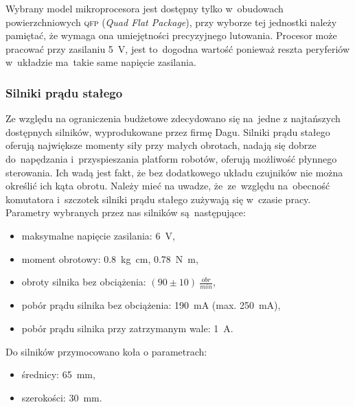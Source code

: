 \documentclass[11pt]{article}
\begin{document}
Wybrany model mikroprocesora jest dostępny tylko w~obudowach powierzchniowych \textsc{qfp} (\textit{Quad Flat Package}), przy wyborze tej jednostki należy pamiętać, że wymaga ona umiejętności precyzyjnego lutowania. Procesor może pracować przy zasilaniu 5~\si{\volt}, jest to~dogodna wartość ponieważ reszta peryferiów w~układzie ma~takie same napięcie zasilania.

\subsubsection{Silniki prądu stałego}
Ze względu na ograniczenia budżetowe zdecydowano się na~jedne z najtańszych dostępnych silników, wyprodukowane przez firmę Dagu.
Silniki prądu stałego oferują największe momenty siły przy małych obrotach, nadają się dobrze do~napędzania i~przyspieszania platform robotów, oferują możliwość płynnego sterowania.
Ich wadą jest fakt, że bez dodatkowego układu czujników nie można określić ich kąta obrotu.
Należy mieć na uwadze, że~ze~względu na~obecność komutatora i~szczotek silniki prądu stałego zużywają się w~czasie pracy.
Parametry wybranych przez nas silników są~następujące:
\begin{itemize}
	\item maksymalne napięcie zasilania: 6~\si{\volt},
	\item moment obrotowy: \SI[inter-unit-product =\ensuremath{\cdot}]{0,8}{\kilogram\centi\meter}, \SI[inter-unit-product =\ensuremath{\cdot}]{0,78}{\newton\meter},
	\item obroty silnika bez obciążenia: $ (90 \pm 10) \ \frac{obr}{min} $,
	\item pobór prądu silnika bez obciążenia: 190~\si{\milli\ampere} (max. 250~\si{\milli\ampere}),
	\item pobór prądu silnika przy zatrzymanym wale: 1~\si{\ampere}.
\end{itemize}
Do silników przymocowano koła o parametrach:
\begin{itemize}
	\item średnicy: 65~\si{\milli\meter},
	\item szerokości: 30~\si{\milli\meter}.
\end{itemize}
\end{document}
